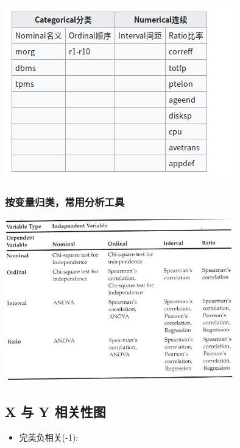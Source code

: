 \includegraphics[width=10cm]{Screenshotfrom2023-01-0420-20-52.png}

\hypertarget{ux6309ux53d8ux91cfux5f52ux7c7bux5e38ux7528ux5206ux6790ux5de5ux5177}{%
\subsubsection{按变量归类，常用分析工具}\label{ux6309ux53d8ux91cfux5f52ux7c7bux5e38ux7528ux5206ux6790ux5de5ux5177}}


\includegraphics[width=10cm]{maxwell_t68.jpg}

\hypertarget{x-ux4e0e-y-ux76f8ux5173ux6027ux56fe}{%
\subsection{X 与 Y 相关性图}\label{x-ux4e0e-y-ux76f8ux5173ux6027ux56fe}}

\begin{itemize}
\tightlist
\item
  完美负相关(-1):
\end{itemize}

